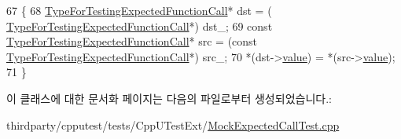 \begin{DoxyCode}
67     \{
68         \hyperlink{class_type_for_testing_expected_function_call}{TypeForTestingExpectedFunctionCall}* dst = (
      \hyperlink{class_type_for_testing_expected_function_call}{TypeForTestingExpectedFunctionCall}*) dst\_;
69         \textcolor{keyword}{const} \hyperlink{class_type_for_testing_expected_function_call}{TypeForTestingExpectedFunctionCall}* src = (\textcolor{keyword}{const} 
      \hyperlink{class_type_for_testing_expected_function_call}{TypeForTestingExpectedFunctionCall}*) src\_;
70         *(dst->\hyperlink{class_type_for_testing_expected_function_call_a1f383aee95bb3864942bbeb7416cbcad}{value}) = *(src->\hyperlink{class_type_for_testing_expected_function_call_a1f383aee95bb3864942bbeb7416cbcad}{value});
71     \}
\end{DoxyCode}


이 클래스에 대한 문서화 페이지는 다음의 파일로부터 생성되었습니다.\+:\begin{DoxyCompactItemize}
\item 
thirdparty/cpputest/tests/\+Cpp\+U\+Test\+Ext/\hyperlink{_mock_expected_call_test_8cpp}{Mock\+Expected\+Call\+Test.\+cpp}\end{DoxyCompactItemize}
